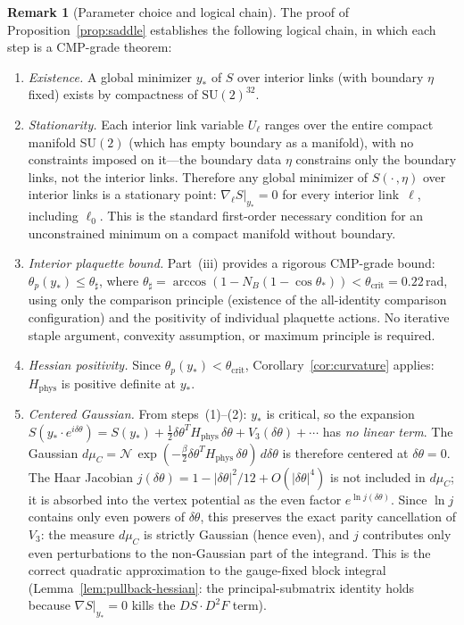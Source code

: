 \documentclass[11pt]{article}
\theoremstyle{definition}
\newtheorem{remark}[theorem]{Remark}
\newcommand{\SU}{\mathrm{SU}}
\begin{document}
\begin{remark}[Parameter choice and logical chain]%
\label{rem:parameters}
The proof of Proposition~\ref{prop:saddle} establishes the
following logical chain, in which each step is a CMP-grade
theorem:

\begin{enumerate}
\item \emph{Existence.}  A global minimizer $y_*$ of $S$ over
interior links (with boundary $\eta$ fixed) exists by
compactness of $\SU(2)^{32}$.

\item \emph{Stationarity.}  Each interior link variable
$U_\ell$ ranges over the entire compact manifold
$\SU(2)$ (which has empty boundary as a manifold),
with no constraints imposed on it---the boundary data $\eta$
constrains only the boundary links, not the interior links.
Therefore any global minimizer of $S(\cdot\,,\eta)$ over
interior links is a stationary
point: $\nabla_\ell S|_{y_*}=0$ for every interior
link~$\ell$, including $\ell_0$.  This is the standard
first-order necessary condition for an unconstrained minimum
on a compact manifold without boundary.

\item \emph{Interior plaquette bound.}  Part~(iii) provides a
rigorous CMP-grade bound: $\theta_p(y_*)\le\theta_\sharp$,
where $\theta_\sharp=\arccos(1-N_B(1-\cos\theta_*))
<\theta_{\mathrm{crit}}=0.22$\,rad, using only the
comparison principle (existence of the all-identity
comparison configuration) and the positivity of individual
plaquette actions.  No iterative staple argument, convexity
assumption, or maximum principle is required.

\item \emph{Hessian positivity.}
Since $\theta_p(y_*)<\theta_{\mathrm{crit}}$,
Corollary~\ref{cor:curvature} applies: $H_{\mathrm{phys}}$
is positive definite at $y_*$.

\item \emph{Centered Gaussian.}
From steps~(1)--(2): $y_*$ is critical, so the expansion
$S(y_*\cdot e^{i\delta\theta})
=S(y_*)+\frac{1}{2}\delta\theta^T H_{\mathrm{phys}}\,\delta\theta
+V_3(\delta\theta)+\cdots$
has \emph{no linear term}.  The Gaussian
$d\mu_C=\mathcal{N}\,\exp(-\frac{\beta}{2}\delta\theta^T
H_{\mathrm{phys}}\,\delta\theta)\,d\delta\theta$
is therefore centered at $\delta\theta=0$.
The Haar Jacobian $j(\delta\theta)=1-|\delta\theta|^2/12
+O(|\delta\theta|^4)$ is not included in $d\mu_C$;
it is absorbed into the vertex potential as the even factor
$e^{\ln j(\delta\theta)}$.  Since $\ln j$ contains only
even powers of $\delta\theta$, this preserves the exact
parity cancellation of $V_3$: the measure $d\mu_C$ is
strictly Gaussian (hence even), and $j$ contributes only
even perturbations to the non-Gaussian part of the
integrand.
This is the
correct quadratic approximation to the gauge-fixed block
integral (Lemma~\ref{lem:pullback-hessian}: the
principal-submatrix identity holds because $\nabla S|_{y_*}=0$
kills the $DS\cdot D^2 F$ term).


\end{enumerate}
\end{remark}
\end{document}
